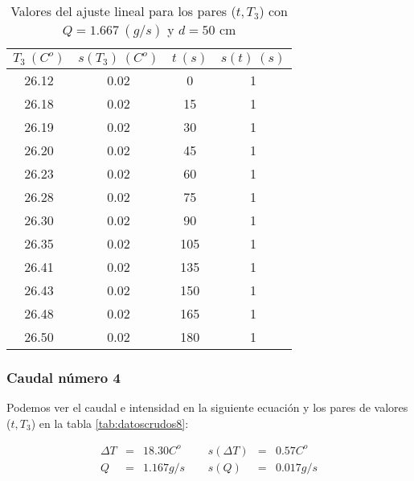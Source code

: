 \documentclass[12pt,a4paper]{article}
\begin{document}
 \begin{table}[h!] 	 \centering 
\begin{tabular}{|c|c|c|c|} 
\hline 
$T_3 \ (C^o)$ & $s(T_3) \ (C^o)$ & $ t \ (s)$ & $s(t) \ (s)$  \\ \hline 
26.12  & 0.02 &  0 & 1 \\ 
\hline
26.18  & 0.02 &  15 & 1 \\ 
\hline
26.19  & 0.02 &  30 & 1 \\ 
\hline
26.20  & 0.02 &  45 & 1 \\ 
\hline
26.23  & 0.02 &  60 & 1 \\ 
\hline
26.28  & 0.02 &  75 & 1 \\ 
\hline
26.30  & 0.02 &  90 & 1 \\ 
\hline
26.35  & 0.02 &  105 & 1 \\ 
\hline
26.41  & 0.02 &  135 & 1 \\ 
\hline
26.43  & 0.02 &  150 & 1 \\ 
\hline
26.48  & 0.02 &  165 & 1 \\ 
\hline
26.50  & 0.02 &  180 & 1 \\ 
\hline
\end{tabular} 
\caption{Valores del ajuste lineal para los pares ($t,T_3$) con $Q=1.667 \ (g/s)$ y $d= 50 $ cm} 
\label{tab:datoscrudos7} 
\end{table} 
 
 \newpage
 
\subsubsection{Caudal número 4} \label{subsec:9} 
 
Podemos ver el caudal e intensidad en la siguiente ecuación y los pares de valores ($t,T_3$) en la tabla \ref{tab:datoscrudos8}: 
 
\begin{equation} 
\begin{array}{lllllll}
\Delta T & = & 18.30 C^o &  \ \ &  s(\Delta T) & =  & 0.57  C^o \\ 
 Q & = & 1.167 g/s &  \ \ &  s(Q) & =  & 0.017  g/s \\ 
 \end{array} 
\end{equation} 
 
\end{document}
